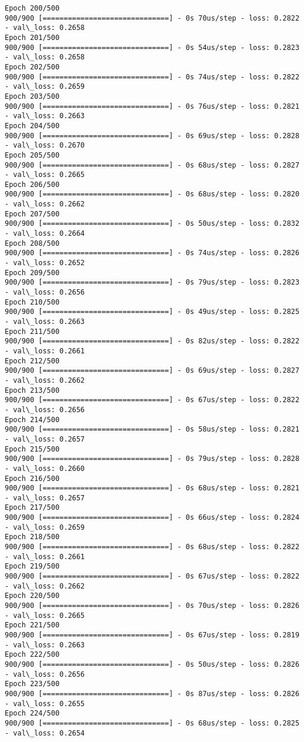 \documentclass[11pt]{article}
\begin{document}
\begin{Verbatim}[commandchars=\\\{\}]
Epoch 200/500
900/900 [==============================] - 0s 70us/step - loss: 0.2822 - val\_loss: 0.2658
Epoch 201/500
900/900 [==============================] - 0s 54us/step - loss: 0.2823 - val\_loss: 0.2658
Epoch 202/500
900/900 [==============================] - 0s 74us/step - loss: 0.2822 - val\_loss: 0.2659
Epoch 203/500
900/900 [==============================] - 0s 76us/step - loss: 0.2821 - val\_loss: 0.2663
Epoch 204/500
900/900 [==============================] - 0s 69us/step - loss: 0.2828 - val\_loss: 0.2670
Epoch 205/500
900/900 [==============================] - 0s 68us/step - loss: 0.2827 - val\_loss: 0.2665
Epoch 206/500
900/900 [==============================] - 0s 68us/step - loss: 0.2820 - val\_loss: 0.2662
Epoch 207/500
900/900 [==============================] - 0s 50us/step - loss: 0.2832 - val\_loss: 0.2664
Epoch 208/500
900/900 [==============================] - 0s 74us/step - loss: 0.2826 - val\_loss: 0.2652
Epoch 209/500
900/900 [==============================] - 0s 79us/step - loss: 0.2823 - val\_loss: 0.2656
Epoch 210/500
900/900 [==============================] - 0s 49us/step - loss: 0.2825 - val\_loss: 0.2663
Epoch 211/500
900/900 [==============================] - 0s 82us/step - loss: 0.2822 - val\_loss: 0.2661
Epoch 212/500
900/900 [==============================] - 0s 69us/step - loss: 0.2827 - val\_loss: 0.2662
Epoch 213/500
900/900 [==============================] - 0s 67us/step - loss: 0.2822 - val\_loss: 0.2656
Epoch 214/500
900/900 [==============================] - 0s 58us/step - loss: 0.2821 - val\_loss: 0.2657
Epoch 215/500
900/900 [==============================] - 0s 79us/step - loss: 0.2828 - val\_loss: 0.2660
Epoch 216/500
900/900 [==============================] - 0s 68us/step - loss: 0.2821 - val\_loss: 0.2657
Epoch 217/500
900/900 [==============================] - 0s 66us/step - loss: 0.2824 - val\_loss: 0.2659
Epoch 218/500
900/900 [==============================] - 0s 68us/step - loss: 0.2822 - val\_loss: 0.2661
Epoch 219/500
900/900 [==============================] - 0s 67us/step - loss: 0.2822 - val\_loss: 0.2662
Epoch 220/500
900/900 [==============================] - 0s 70us/step - loss: 0.2826 - val\_loss: 0.2665
Epoch 221/500
900/900 [==============================] - 0s 67us/step - loss: 0.2819 - val\_loss: 0.2663
Epoch 222/500
900/900 [==============================] - 0s 50us/step - loss: 0.2826 - val\_loss: 0.2656
Epoch 223/500
900/900 [==============================] - 0s 87us/step - loss: 0.2826 - val\_loss: 0.2655
Epoch 224/500
900/900 [==============================] - 0s 68us/step - loss: 0.2825 - val\_loss: 0.2654

\end{Verbatim}
\end{document}
